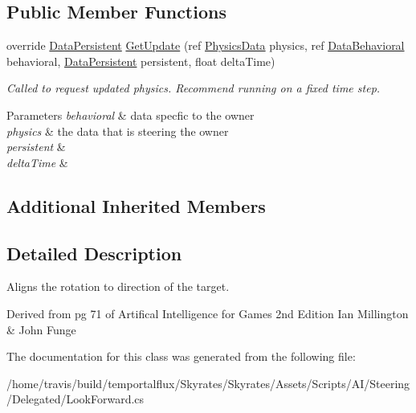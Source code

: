 \subsection*{Public Member Functions}
\begin{DoxyCompactItemize}
\item 
\hypertarget{class_skyrates_1_1_a_i_1_1_steering_1_1_delegated_1_1_look_forward_a6a922b3310ddb2fe97dbe9a9c1d442ce}{override \hyperlink{class_skyrates_1_1_a_i_1_1_behavior_1_1_data_persistent}{Data\-Persistent} \hyperlink{class_skyrates_1_1_a_i_1_1_steering_1_1_delegated_1_1_look_forward_a6a922b3310ddb2fe97dbe9a9c1d442ce}{Get\-Update} (ref \hyperlink{class_skyrates_1_1_physics_1_1_physics_data}{Physics\-Data} physics, ref \hyperlink{class_skyrates_1_1_a_i_1_1_behavior_1_1_data_behavioral}{Data\-Behavioral} behavioral, \hyperlink{class_skyrates_1_1_a_i_1_1_behavior_1_1_data_persistent}{Data\-Persistent} persistent, float delta\-Time)}\label{class_skyrates_1_1_a_i_1_1_steering_1_1_delegated_1_1_look_forward_a6a922b3310ddb2fe97dbe9a9c1d442ce}

\begin{DoxyCompactList}\small\item\em Called to request updated physics. Recommend running on a fixed time step. 


\begin{DoxyParams}{Parameters}
{\em behavioral} & data specfic to the owner\\
\hline
{\em physics} & the data that is steering the owner\\
\hline
{\em persistent} & \\
\hline
{\em delta\-Time} & \\
\hline
\end{DoxyParams}
 \end{DoxyCompactList}\end{DoxyCompactItemize}
\subsection*{Additional Inherited Members}


\subsection{Detailed Description}
Aligns the rotation to direction of the target. 

Derived from pg 71 of Artifical Intelligence for Games 2nd Edition Ian Millington \& John Funge 

The documentation for this class was generated from the following file\-:\begin{DoxyCompactItemize}
\item 
/home/travis/build/temportalflux/\-Skyrates/\-Skyrates/\-Assets/\-Scripts/\-A\-I/\-Steering/\-Delegated/Look\-Forward.\-cs\end{DoxyCompactItemize}
